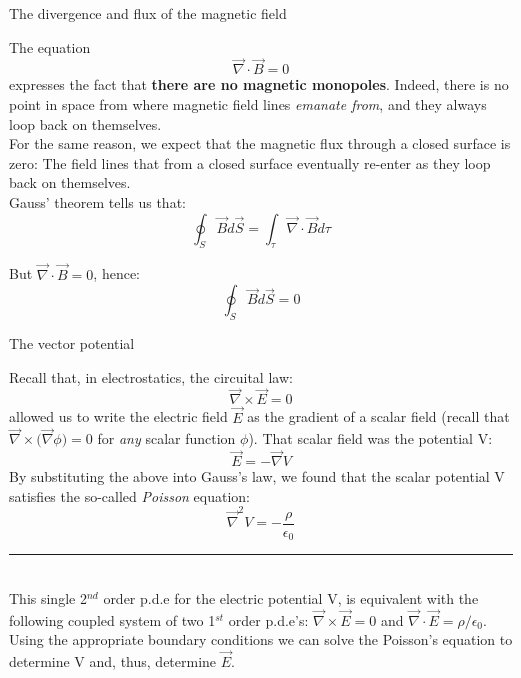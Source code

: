 \begin{frame}{The divergence and flux of the magnetic field}

The equation
\begin{equation*}
         \vec{\nabla} \cdot \vec{B} =  0
\end{equation*}
expresses the fact that {\bf there are no magnetic monopoles}.
Indeed, there is no point in space from where magnetic field lines {\em emanate from},
and they always loop back on themselves.\\

\vspace{0.2cm}
For the same reason, we expect that the magnetic flux through a closed surface is zero:
The field lines that from a closed surface eventually re-enter as they loop back on themselves.\\

Gauss' theorem tells us that:
\begin{equation*}
         \oint_{S} \vec{B} d\vec{S} = \int_{\tau} \vec{\nabla} \cdot \vec{B} d\tau
\end{equation*}

But $\vec{\nabla} \cdot \vec{B} =  0$, hence:
\begin{equation*}
         \oint_{S} \vec{B} d\vec{S} = 0
\end{equation*}

\end{frame}

%
%
%

\begin{frame}{The vector potential}

Recall that, in electrostatics, the circuital law:
\begin{equation*}
      \vec{\nabla} \times \vec{E} = 0
\end{equation*}
allowed us to write the electric field $\vec{E}$ as the gradient of a scalar field
(recall that $\vec{\nabla} \times \Big( \vec{\nabla} \phi \Big) =0$
for {\em any} scalar function $\phi$).
That scalar field was the potential V:
\begin{equation*}
      \vec{E} = - \vec{\nabla} V
\end{equation*}
By substituting the above into Gauss's law,
we found that the scalar potential V satisfies the so-called {\em Poisson} equation:
\begin{equation*}
      \vec{\nabla}^{2} V = - \frac{\rho}{\epsilon_0}
\end{equation*}

\noindent\rule{2cm}{0.4pt}\\
{\scriptsize
This single 2$^{nd}$ order p.d.e for the electric potential V, is equivalent with the following coupled system of
two 1$^{st}$ order p.d.e's: $\vec{\nabla} \times \vec{E} = 0$ and  $\vec{\nabla} \cdot \vec{E} = \rho/\epsilon_0$.
Using the appropriate boundary conditions we can solve the Poisson's
equation to determine V and, thus, determine $\vec{E}$.\\
}

\end{frame}

